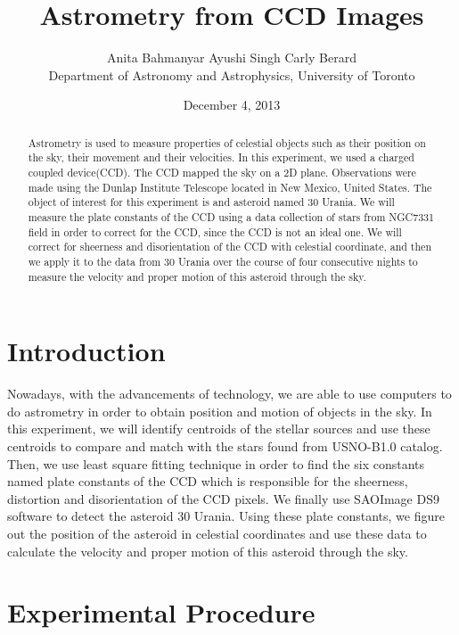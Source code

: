 \documentclass[letterpaper,12pt]{article}
\title{Astrometry from CCD Images }
\author{Anita Bahmanyar \qquad Ayushi Singh \qquad Carly Berard \\Department of Astronomy and Astrophysics, University of Toronto}
\affil{\small {anita.bahmanyar@mail.utoronto.ca}}
\date{December 4, 2013}
\begin{document}
\maketitle

\begin{abstract}
\label{abstract}
Astrometry is used to measure properties of celestial objects such as their position on the sky, their movement and their velocities. In this experiment, we used a charged coupled device(CCD). The CCD mapped the sky on a 2D plane. Observations were made using the Dunlap Institute Telescope located in New Mexico, United States. The object of interest for this experiment is and asteroid named 30 Urania. We will measure the plate constants of the CCD using a data collection of stars from NGC7331 field in order to correct for the CCD, since the CCD is not an ideal one. We will correct for sheerness and disorientation of the CCD with celestial coordinate, and then we apply it to the data from 30 Urania over the course of four consecutive nights to measure the velocity and proper motion of this asteroid through the sky.

\end{abstract}

\section{Introduction}
\label{sec:introduction}
Nowadays, with the advancements of technology, we are able to use computers to do astrometry in order to obtain position and motion of objects in the sky. In this experiment, we will identify centroids of the stellar sources and use these centroids to compare  and match with the stars found from USNO-B1.0 catalog. Then, we use least square fitting technique in order to find the six constants named plate constants of the CCD which is responsible for the sheerness, distortion and disorientation of the CCD pixels. We finally use SAOImage DS9 software to detect the asteroid 30 Urania. Using these plate constants, we figure out the position of the asteroid in celestial coordinates and use these data to calculate the velocity and proper motion of this asteroid through the sky.


\section{Experimental Procedure}
\label{sec:experimental procedure}
\end{document}
